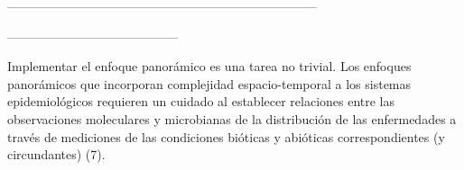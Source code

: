 --------------------------------------------------------------------------



-----------------------------------------





Implementar el enfoque panorámico es una tarea no trivial. Los enfoques
panorámicos que incorporan complejidad espacio-temporal a los sistemas
epidemiológicos requieren un cuidado al establecer relaciones entre las
observaciones moleculares y microbianas de la distribución de las enfermedades
a través de mediciones de las condiciones bióticas y abióticas
correspondientes (y circundantes) (7).



